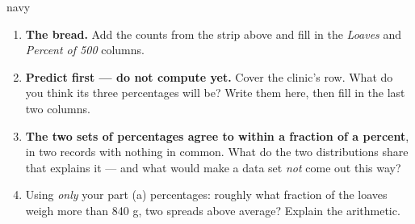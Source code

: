 \begin{scenariobox}{navy}
\vspace{2pt}
\normalsize
\begin{enumerate}[label=\textbf{\alph*.}, leftmargin=1.8em, itemsep=4pt]
  \item \textbf{The bread.} Add the counts from the strip above and fill in the \emph{Loaves} and
        \emph{Percent of 500} columns.
  \item \textbf{Predict first --- do not compute yet.} Cover the clinic's row. What do you think
        its three percentages will be? Write them here, then fill in the last two columns.
  \item \textbf{The two sets of percentages agree to within a fraction of a percent}, in two
        records with nothing in common. What do the two distributions share that explains it ---
        and what would make a data set \emph{not} come out this way?
  \item Using \emph{only} your part (a) percentages: roughly what fraction of the loaves weigh
        more than 840 g, two spreads above average? Explain the arithmetic.
\end{enumerate}
\end{scenariobox}

